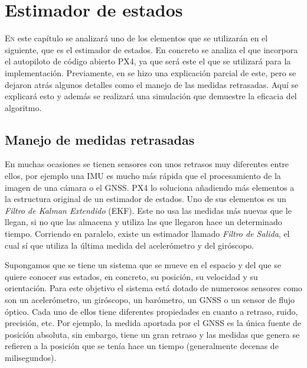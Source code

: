 \chapter{Estimador de estados}\label{chp:est}

\lettrine[lraise=-0.1, lines=2, loversize=0.2]{E}{n} este capítulo se analizará uno de los elementos que se utilizarán en el siguiente, que es el estimador de estados. En concreto se analiza el que incorpora el autopiloto de código abierto PX4, ya que será este el que se utilizará para la implementación. Previamente, en \cite{arias2019control} se hizo una explicación parcial de este, pero se dejaron atrás algunos detalles como el manejo de las medidas retrasadas. Aquí se explicará esto y además se realizará una simulación que demuestre la eficacia del algoritmo.

\section{Manejo de medidas retrasadas}
En muchas ocasiones se tienen sensores con unos retrasos muy diferentes entre ellos, por ejemplo una IMU es mucho más rápida que el procesamiento de la imagen de una cámara o el GNSS. PX4 lo soluciona añadiendo más elementos a la estructura original de un estimador de estados. Uno de sus elementos es un \textit{Filtro de Kalman Extendido} (EKF). Este no usa las medidas más nuevas que le llegan, si no que las almacena y utiliza las que llegaron hace un determinado tiempo. Corriendo en paralelo, existe un estimador llamado \textit{Filtro de Salida}, el cual sí que utiliza la última medida del acelerómetro y del giróscopo. 


Supongamos que se tiene un sistema que se mueve en el espacio y del que se quiere conocer sus estados, en concreto, su posición, su velocidad y su orientación. Para este objetivo el sistema está dotado de numerosos sensores como son un acelerómetro, un giróscopo, un barómetro, un GNSS o un sensor de flujo óptico. Cada uno de ellos tiene diferentes propiedades en cuanto a retraso, ruido, precisión, etc. Por ejemplo, la medida aportada por el GNSS es la única fuente de posición absoluta, sin embargo, tiene un gran retraso y las medidas que genera se refieren a la posición que se tenía hace un tiempo (generalmente decenas de milisegundos). 

